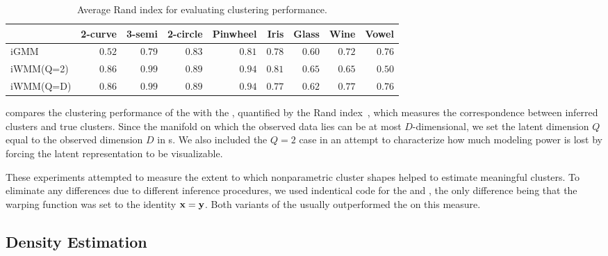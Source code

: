 \begin{table}[ht!]
\centering
\caption[Clustering performance comparison]
{Average Rand index for evaluating clustering performance.}
\label{tab:rand}
\begin{tabular}{lrrrrrrrr}
\hline
 & 2-curve & 3-semi & 2-circle & Pinwheel & Iris  & Glass  & Wine  & Vowel  \\
\hline
iGMM & $0.52$ & $0.79$ & $0.83$ & $0.81$ & $0.78$ & $0.60$ & $0.72$ & $\mathbf{0.76}$ \\
iWMM(Q=2) & $\mathbf{0.86}$ & $\mathbf{0.99}$ & $\mathbf{0.89}$ & $\mathbf{0.94}$ & $\mathbf{0.81}$ & $\mathbf{0.65}$ & $0.65$ & $0.50$ \\
iWMM(Q=D) & $\mathbf{0.86}$ & $\mathbf{0.99}$ & $\mathbf{0.89}$ & $\mathbf{0.94}$ & $0.77$ & $0.62$ & $\mathbf{0.77}$ & $\mathbf{0.76}$ \\
\hline
\end{tabular}
\end{table}
%
 compares the clustering performance of the \iwmm{} with the \iGMM{}, quantified by the Rand index~\citep{rand1971objective}, which measures the correspondence between inferred clusters and true clusters.
Since the manifold on which the observed data lies can be at most $D$-dimensional, we set the latent dimension $Q$ equal to the observed dimension $D$ in \iwmm{}s.
We also included the $Q = 2$ case in an attempt to characterize how much modeling power is lost by forcing the latent representation to be visualizable. 

These experiments attempted to measure the extent to which nonparametric cluster shapes helped to estimate meaningful clusters.
To eliminate any differences due to different inference procedures, we used indentical code for the \iGMM{} and \iwmm{}, the only difference being that the warping function was set to the identity ${\bf{x}} = {\bf{y}}$.
Both variants of the \iwmm{} usually outperformed the \iGMM{} on this measure.


\subsection{Density Estimation}

